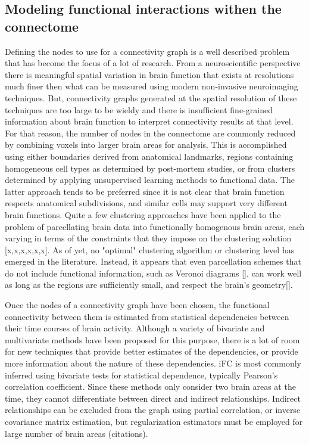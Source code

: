\subsection{Modeling functional interactions withen the connectome}

Defining the nodes to use for a connectivity graph is a well described problem that has become the focus of a lot of research. From a neuroscientific perspective there is meaningful spatial variation in brain function that exists at resolutions much finer then what can be measured using modern non-invasive neuroimaging techniques. But, connectivity graphs generated at the spatial resolution of these techniques are too large to be wieldy and there is insufficient fine-grained information about brain function to interpret connectivity results at that level. For that reason, the number of nodes in the connectome are commonly reduced by combining voxels into larger brain areas for analysis. This is accomplished using either boundaries derived from anatomical landmarks, regions containing homogeneous cell types as determined by post-mortem studies, or from clusters determined by applying unsupervised learning methods to functional data. The latter approach tends to be preferred since it is not clear that brain function respects anatomical subdivisions, and similar cells may support very different brain functions. Quite a few clustering approaches have been applied to the problem of parcellating brain data into functionally homogenous brain areas, each varying in terms of the constraints that they impose on the clustering solution [x,x,x,x,x,x]. As of yet, no "optimal" clustering algorithm or clustering level has emerged in the literature. Instead, it appears that even parcellation schemes that do not include functional information, such as Veronoi diagrams [], can work well as long as the regions are sufficiently small, and respect the brain's geometry[].

Once the nodes of a connectivity graph have been chosen, the functional connectivity between them is estimated from statistical dependencies between their time courses of brain activity. Although a variety of bivariate and multivariate methods have been proposed for this purpose\cite{SmithNeuor2010,Varoquaux}, there is a lot of room for new techniques that provide better estimates of the dependencies, or provide more information about the nature of these dependencies. iFC is most commonly inferred using bivariate tests for statistical dependence, typically Pearson's correlation coefficient. Since these methods only consider two brain areas at the time, they cannot differentiate between direct and indirect relationships. Indirect relationships can be excluded from the graph using partial correlation, or inverse covariance matrix estimation, but regularization estimators must be employed for large number of brain areas (citations). 

